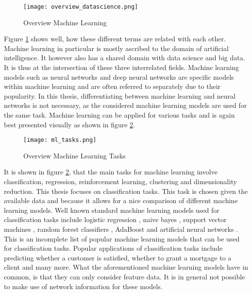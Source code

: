 	\begin{figure}[h]
		\centering
		\texttt{[image: overview\_datascience.png]}
		\caption{Overview Machine Learning}
		\citep{Frauenhofer2021}
		\label{fig:ml_overview}
	\end{figure} 

	\noindent Figure \ref{fig:ml_overview} shows well, how these different
	terms are related with each other. Machine learning in particular is
	mostly ascribed to the domain of artificial intelligence. It however also 
	has a shared domain with data science and big data. It is thus at the
	intersection of these three interrelated fields. Machine learning models 
	such as neural networks and deep neural networks are specific models within
	machine learning and are often referred to separately due to their
	popularity. In this thesis, differentiating between machine learning and
	neural networks is not necessary, as the considered machine learning models
	are used for the same task. Machine learning can be applied for various
	tasks and is again best presented visually as shown in figure 
	\ref{fig:ml_tasks}.

	\begin{figure}[h]
		\centering
		\texttt{[image: ml\_tasks.png]}
		\caption{Overview Machine Learning Tasks}
		\citep{Artisan2020}
		\label{fig:ml_tasks}
	\end{figure} 

	\noindent It is shown in figure \ref{fig:ml_tasks}, that the main tasks for
	machine learning involve classification, regression, reinforcement
	learning, clustering and dimensionality reduction. This thesis focuses on 
	classification tasks. This task is chosen given the available data and 
	because it allows for a nice comparison of different machine learning models. 
	Well known standard machine learning models used for classification tasks 
	include logistic regression \citep{cramer2002origins}, naive bayes 
	\citep{zhang2004bayes}, support vector machines 
	\citep{platt1999probabilistic}, random forest classifiers
	\citep{breiman2001random}, AdaBoost \citep{freund1997decision} and
	artificial neural networks \citep{mcculloch1943logical}. This is an
	incomplete list of popular machine learning models that can be used for
	classification tasks. Popular applications of classification tasks include 
	predicting whether a customer is satisfied, whether to grant a mortgage 
	to a client and many more. What the aforementioned machine learning models
	have in common, is that they can only consider feature data. It is in
	general not possible to make use of network information for these models. \\

